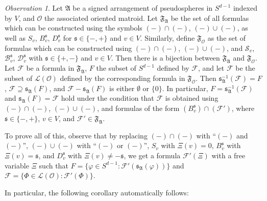 \documentclass[a4paper,11pt,reqno, english]{amsart}
\theoremstyle{definition}
\theoremstyle{remark}
\newtheorem{observation}[theorem]{Observation}
\begin{document}
\begin{observation}\label{obs:curly-vs-print}
    Let $\mathfrak{A}$ be a signed arrangement of pseudospheres in $S^{d-1}$ indexed by $V$, and $\mathscr{O}$ the associated oriented matroid. Let $\mathfrak{F}_\mathfrak{A}$ be the set of all formulas which can be constructed using the symbols $(-)\cap(-)$, $(-)\cup(-)$, as well as $S_v$, $B^\mathfrak{s}_v$, $D^\mathfrak{s}_v$ for $\mathfrak{s}\in\{-,+\}$ and $v\in V$. Similarly, define $\mathfrak{F}_\mathscr{O}$ as the set of formulas which can be constructed using $(-)\cap(-)$, $(-)\cup(-)$, and $\mathscr{S}_v$, $\mathscr{B}^\mathfrak{s}_v$, $\mathscr{D}^\mathfrak{s}_v$ with $\mathfrak{s}\in\{+,-\}$ and $v\in V$. Then there is a bijection between $\mathfrak{F}_\mathfrak{A}$ and $\mathfrak{F}_\mathscr{O}$. Let $\mathcal{F}$ be a formula in $\mathfrak{F}_\mathfrak{A}$, $F$ the subset of $S^{d-1}$ defined by $\mathcal{F}$, and let $\mathscr{F}$ be the subset of $\mathscr{L}(\mathscr{O})$ defined by the corresponding formula in $\mathfrak{F}_\mathscr{O}$. Then $\mathfrak{s}_\mathfrak{A}^{-1}(\mathscr{F})=F$, $\mathscr{F}\supseteq \mathfrak{s}_\mathfrak{A}(F)$, and $\mathscr{F}-\mathfrak{s}_\mathfrak{A}(F)$ is either $\emptyset$ or $\{0\}$. In particular, $F=\mathfrak{s}_\mathfrak{A}^{-1}(\mathscr{F})$ and $\mathfrak{s}_\mathfrak{A}(F)=\mathscr{F}$ hold under the condition that $\mathcal{F}$ is obtained using $(-)\cap(-)$, $(-)\cup(-)$, and formulas of the form $(B^\mathfrak{s}_v)\cap(\mathcal{F}')$, where $\mathfrak{s}\in\{-,+\}$, $v\in V$, and $\mathcal{F}'\in\mathfrak{F}_\mathfrak{A}$.

    To prove all of this, observe that by replacing $(-)\cap(-)$ with ``$(-)$ and $(-)$'', $(-)\cup(-)$ with ``$(-)$ or $(-)$'', $S_v$ with $\Xi(v)=0$, $B^\mathfrak{s}_v$ with $\Xi(v)=\mathfrak{s}$, and $D^\mathfrak{s}_v$ with $\Xi(v)\neq -\mathfrak{s}$, we get a formula $\mathcal{F}'(\Xi)$ with a free variable $\Xi$ such that $F=\{\varphi\in S^{d-1}:\mathcal{F}'(\mathfrak{s}_\mathfrak{A}(\varphi))\}$ and $\mathscr{F}=\{\Phi\in\mathscr{L}(\mathscr{O}):\mathcal{F}'(\Phi)\}$.
\end{observation}  
In particular, the following corollary automatically follows:
\end{document}
